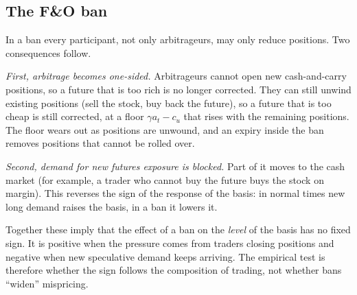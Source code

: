 \documentclass[11pt,a4paper]{article}
\begin{document}
\subsection{The F\&O ban}
In a ban every participant, not only arbitrageurs, may only reduce positions. Two consequences follow.

\emph{First, arbitrage becomes one-sided.} Arbitrageurs cannot open new cash-and-carry positions, so a future that is too rich
is no longer corrected. They can still unwind existing positions (sell the stock, buy back the future), so a future that is
too cheap is still corrected, at a floor $\gamma a_t-c_u$ that rises with the remaining positions. The floor wears out as
positions are unwound, and an expiry inside the ban removes positions that cannot be rolled over.

\emph{Second, demand for new futures exposure is blocked.} Part of it moves to the cash market (for example, a trader who
cannot buy the future buys the stock on margin). This reverses the sign of the response of the basis: in normal times new long
demand raises the basis, in a ban it lowers it.

Together these imply that the effect of a ban on the \emph{level} of the basis has no fixed sign. It is positive when the
pressure comes from traders closing positions and negative when new speculative demand keeps arriving. The empirical test is
therefore whether the sign follows the composition of trading, not whether bans ``widen'' mispricing.
\end{document}
